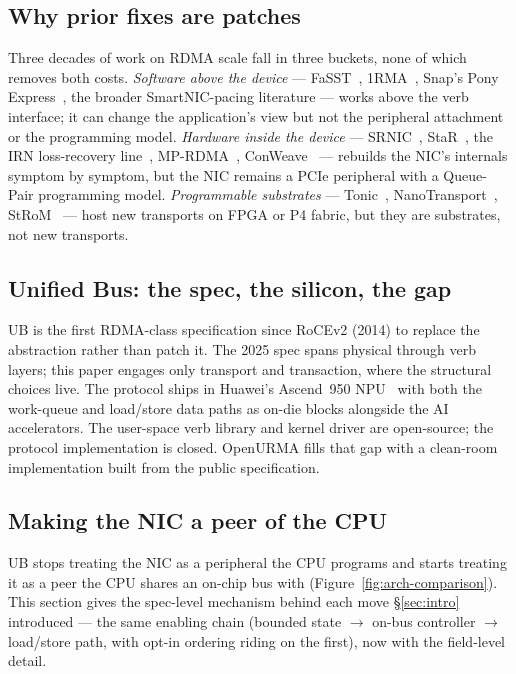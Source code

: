 \documentclass[10pt,twocolumn]{article}
\begin{document}
\subsection{Why prior fixes are patches}
\label{subsec:patches}

Three decades of work on RDMA scale fall in three buckets, none
of which removes both costs.
\emph{Software above the device} ---
FaSST~\cite{kalia:fasst-extended}, 1RMA~\cite{singhvi2020:1rma}, Snap's
Pony Express~\cite{marty2019:snap}, the broader SmartNIC-pacing
literature --- works above
the verb interface; it can change the application's view but not
the peripheral attachment or the programming model.
\emph{Hardware inside the device} ---
SRNIC~\cite{wang2023:srnic}, StaR~\cite{wang2021:star}, the IRN
loss-recovery line~\cite{mittal2018:irn,lu2017:melo,huang2024:fasr,li2025:dcp},
MP-RDMA~\cite{lu2018:mprdma}, ConWeave~\cite{tan2023:conweave}
--- rebuilds the NIC's internals symptom by symptom, but the NIC
remains a PCIe peripheral with a Queue-Pair programming model.
\emph{Programmable substrates} ---
Tonic~\cite{arashloo2020:tonic},
NanoTransport~\cite{ibanez2021:nanotransport},
StRoM~\cite{strom-eurosys20} --- host new transports on FPGA or
P4 fabric, but they are substrates, not new transports.

\subsection{Unified Bus: the spec, the silicon, the gap}
\label{subsec:ub-position}

UB is the first RDMA-class specification since RoCEv2 (2014) to
replace the abstraction rather than patch it. The 2025 spec spans
physical through verb layers; this paper engages only transport
and transaction, where the structural choices live. The protocol
ships in Huawei's Ascend~950 NPU~\cite{huawei2026:ascend950}
with both the work-queue and load/store data paths as on-die
blocks alongside the AI accelerators. The user-space verb library
and kernel driver are open-source; the protocol implementation is
closed. OpenURMA fills that gap with a clean-room implementation
built from the public specification.

\subsection{Making the NIC a peer of the CPU}
\label{subsec:ub-changes}

UB stops treating the NIC as a peripheral the CPU programs and
starts treating it as a peer the CPU shares an on-chip bus with
(Figure~\ref{fig:arch-comparison}). This section gives the
spec-level mechanism behind each move \S\ref{sec:intro} introduced
--- the same enabling chain (bounded state $\rightarrow$ on-bus
controller $\rightarrow$ load/store path, with opt-in ordering
riding on the first), now with the field-level detail.
\end{document}
